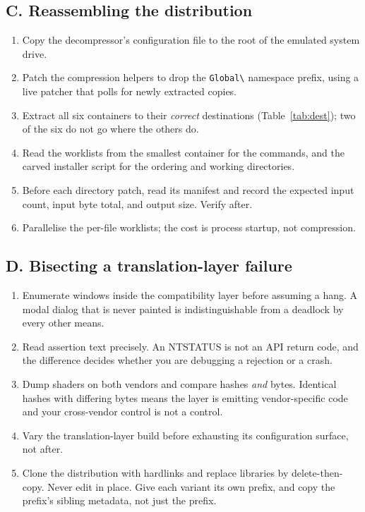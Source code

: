 \subsection*{C. Reassembling the distribution}

\begin{enumerate}
\item Copy the decompressor's configuration file to the root of the emulated
      system drive.
\item Patch the compression helpers to drop the \verb|Global\| namespace prefix,
      using a live patcher that polls for newly extracted copies.
\item Extract all six containers to their \emph{correct} destinations
      (Table~\ref{tab:dest}); two of the six do not go where the others do.
\item Read the worklists from the smallest container for the commands, and the
      carved installer script for the ordering and working directories.
\item Before each directory patch, read its manifest and record the expected
      input count, input byte total, and output size. Verify after.
\item Parallelise the per-file worklists; the cost is process startup, not
      compression.
\end{enumerate}

\subsection*{D. Bisecting a translation-layer failure}

\begin{enumerate}
\item Enumerate windows inside the compatibility layer before assuming a hang.
      A modal dialog that is never painted is indistinguishable from a deadlock
      by every other means.
\item Read assertion text precisely. An NTSTATUS is not an API return code, and
      the difference decides whether you are debugging a rejection or a crash.
\item Dump shaders on both vendors and compare hashes \emph{and} bytes. Identical
      hashes with differing bytes means the layer is emitting vendor-specific
      code and your cross-vendor control is not a control.
\item Vary the translation-layer build before exhausting its configuration
      surface, not after.
\item Clone the distribution with hardlinks and replace libraries by
      delete-then-copy. Never edit in place. Give each variant its own prefix,
      and copy the prefix's sibling metadata, not just the prefix.
\end{enumerate}

